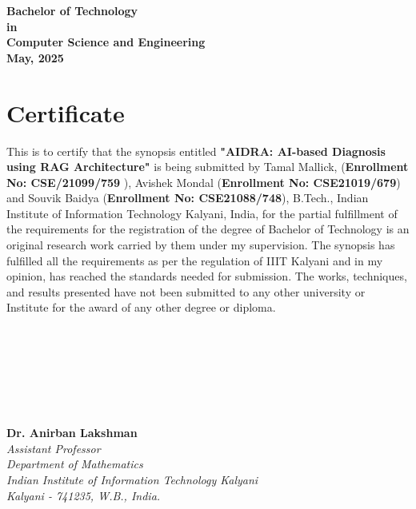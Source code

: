 \documentclass[12pt,a4paper]{report}
\newcommand{\mytitle}{AIDRA: AI-based Diagnosis using RAG Architecture}
\newcommand{\mySpaceHalf}{0.5cm}
\begin{document}
\begin{titlepage}
{{\bfseries %
	 Bachelor of Technology \\ 
	 in \\
	 Computer Science and Engineering\\ \vspace{\mySpaceHalf}
	  May, 2025 \fontsize{18}{22}}\selectfont {}\selectfont}
    \vspace*{\fill}
\end{titlepage}
\restoregeometry


%
	\newpage
	\chapter*{\centering Certificate}
\label{sec:engack}
This is to certify that the synopsis entitled \textbf{"\mytitle "} is being submitted by Tamal Mallick,
 (\textbf{Enrollment No: CSE/21099/759 }), Avishek Mondal (\textbf{Enrollment No: CSE21019/679}) and Souvik Baidya (\textbf{Enrollment No: CSE21088/748}), B.Tech., Indian Institute of Information Technology Kalyani, India, for the partial fulfillment of the requirements for the registration of the degree of Bachelor of Technology is an original research work carried by them under my supervision. The synopsis has fulfilled all the requirements as per the regulation of IIIT Kalyani and in my opinion, has reached the standards needed for submission. The works, techniques, and results presented have not been submitted to any other university or Institute for the award of any other degree or diploma.
\\
\\
\\
\\
\\
\\
\\
\\
\noindent
\textbf{Dr. Anirban Lakshman}  \\ 
\textit{Assistant Professor \\
Department of Mathematics\\
Indian Institute of Information Technology Kalyani \\
Kalyani - 741235, W.B., India.} \\[1em]
\cleardoublepage
\end{document}
